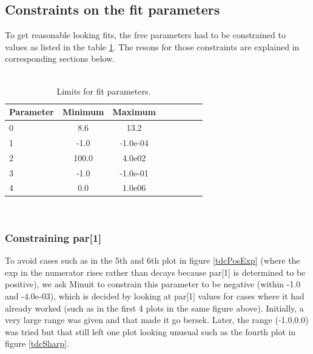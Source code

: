 \documentclass[12pt,epsfig]{article}
\begin{document}
\subsection{Constraints on the fit parameters}
To get reasonable looking fits, the free parameters had to be constrained to values as listed in
the table \ref{tabParLimits}. The resons for those constraints are explained in corresponding 
sections below.
\\
\\
\begin{table}%
\centering
\begin{tabular}{l*{6}{c}r}

Parameter         & Minimum & Maximum \\
\hline
0                 & 8.6   & 13.2     \\
1                 & -1.0  & -1.0e-04 \\
2                 & 100.0 & 4.0e02   \\
3                 & -1.0  & -1.0e-01 \\
4                 & 0.0   & 1.0e06   \\
\hline
\end{tabular}
\caption{Limits for fit parameters.}   \label{tabParLimits}
\end{table}
\\

\subsubsection{Constraining par[1]}
To avoid cases such as in the 5th and 6th plot in figure \ref{tdcPosExp} %
(where the exp in the numerator rises rather than decays because par[1] is determined to be positive), 
we ask Minuit to constrain this parameter to be negative (within -1.0 and -4.0e-03), which is decided by looking 
at par[1] values for cases where it had already worked (such as in the first 4 plots in the same figure above). 
Initially, a very large range was given and that made it go bersek. Later, the range (-1.0,0.0) was tried but that 
still left one plot looking unusual such as the fourth plot in figure \ref{tdcSharp}.
\end{document}
